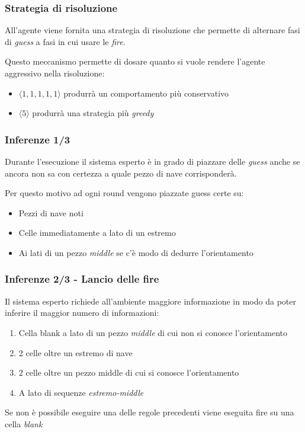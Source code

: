 \documentclass[11pt]{beamer}
\begin{document}
\begin{frame}
    \frametitle{Strategia di risoluzione}
    All'agente viene fornita una strategia di risoluzione che permette di alternare fasi di \emph{guess} a fasi in cui usare le \emph{fire}.

    Questo meccanismo permette di dosare quanto si vuole rendere l'agente aggressivo nella risoluzione:
    \begin{itemize}
        \item $\langle 1, 1, 1, 1, 1 \rangle$ produrrà un comportamento più conservativo
        \item $\langle 5 \rangle$ produrrà una strategia più \emph{greedy}
    \end{itemize}
\end{frame}

\begin{frame}
    \frametitle{Inferenze 1/3}
    Durante l'esecuzione il sistema esperto è in grado di piazzare delle \emph{guess} anche se ancora non sa con certezza a quale pezzo di nave corrisponderà.

    Per questo motivo ad ogni round vengono piazzate guess certe su:
    \begin{itemize}
        \item Pezzi di nave noti
        \item Celle immediatamente a lato di un estremo
        \item Ai lati di un pezzo \emph{middle} se c'è modo di dedurre l'orientamento
    \end{itemize}
\end{frame}

\begin{frame}
    \frametitle{Inferenze 2/3 - Lancio delle fire}
    Il sistema esperto richiede all'ambiente maggiore informazione in modo da poter inferire il maggior numero di informazioni:
    \begin{enumerate}
        \item Cella blank a lato di un pezzo \emph{middle} di cui non si conosce l'orientamento
        \item 2 celle oltre un estremo di nave 
        \item 2 celle oltre un pezzo middle di cui si conosce l'orientamento
        \item A lato di sequenze \emph{estremo-middle}
    \end{enumerate}

    Se non è possibile eseguire una delle regole precedenti viene eseguita fire su una cella \emph{blank}
\end{frame}
\end{document}

